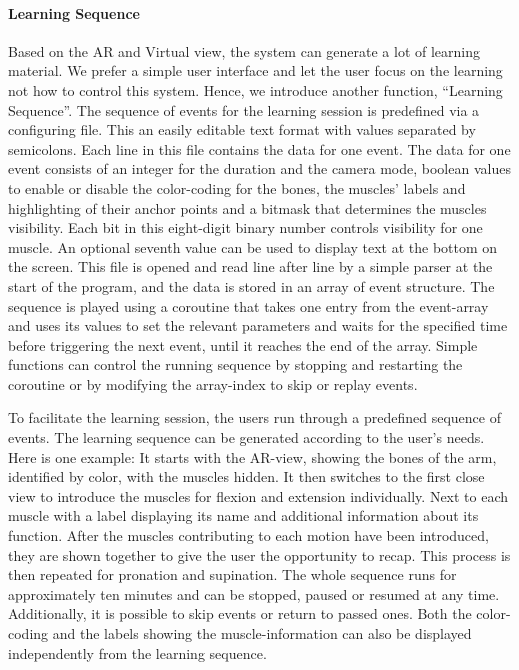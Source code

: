 \paragraph{Learning Sequence}
Based on the AR and Virtual view, the system can generate a lot of learning material. We prefer a simple user interface and let the user focus on the learning not  how to control this system. 
Hence, we introduce another function, ``Learning Sequence''.
The sequence of events for the learning session is predefined via a configuring file. This an easily editable text format with values separated by semicolons. Each line in this file contains the data for one event. The data for one event consists of an integer for the duration and the camera mode, boolean values to enable or disable the color-coding for the bones, the muscles' labels and highlighting of their anchor points and a bitmask that determines the muscles visibility. Each bit in this eight-digit binary number controls visibility for one muscle. An optional seventh value can be used to display text at the bottom on the screen. 
This file is opened and read line after line by a simple parser at the start of the program, and the data is stored in an array of event structure. 
The sequence is played using a coroutine that takes one entry from the event-array and uses its values to set the relevant parameters and waits for the specified time before triggering the next event, until it reaches the end of the array. Simple functions can control the running sequence by stopping and restarting the coroutine or by modifying the array-index to skip or replay events.

To facilitate the learning session, the users run through a predefined sequence of events. The learning sequence can be generated according to the user's needs. Here is one example: 
It starts with the AR-view, showing the bones of the arm, identified by color, with the muscles hidden. It then switches to the first close view to introduce the muscles for flexion and extension individually. Next to each muscle with a label displaying its name and additional information about its function. After the muscles contributing to each motion have been introduced, they are shown together to give the user the opportunity to recap. This process is then repeated for pronation and supination. 
The whole sequence runs for approximately ten minutes and can be stopped, paused or resumed at any time. Additionally, it is possible to skip events or return to passed ones. Both the color-coding and the labels showing the muscle-information can also be displayed independently from the learning sequence.

